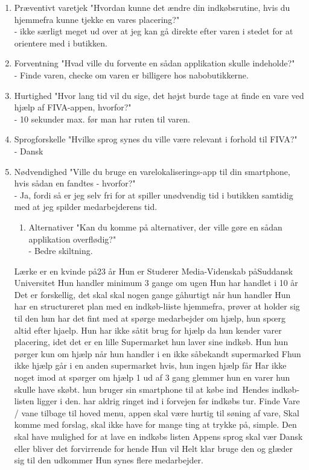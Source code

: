\begin{enumerate}
\begin{enumerate}
\begin{enumerate}
\item Præventivt varetjek "Hvordan kunne det ændre din indkøbsrutine, hvis du hjemmefra kunne tjekke en vares placering?"\\
  - ikke særligt meget ud over at jeg kan gå direkte efter varen i stedet for at orientere med i butikken.
\item Forventning "Hvad ville du forvente en sådan applikation skulle indeholde?"\\
  - Finde varen, checke om varen er billigere hos nabobutikkerne. 
\item Hurtighed	"Hvor lang tid vil du sige, det højst burde tage at finde en vare ved hjælp af FIVA-appen, hvorfor?"\\
  - 10 sekunder max. før man har ruten til varen.
\item Sprogforskelle "Hvilke sprog synes du ville være relevant i forhold til FIVA?"\\
  - Dansk
\item Nødvendighed "Ville du bruge en varelokaliserings-app til din smartphone, hvis sådan en fandtes - hvorfor?"\\
  - Ja, fordi så er jeg selv fri for at spiller unødvendig tid i butikken samtidig med at jeg spilder medarbejderens tid.
\begin{enumerate}
\item Alternativer "Kan du komme på alternativer, der ville gøre en sådan applikation overflødig?"\\
  - Bedre skiltning.
\end{enumerate}

L\ae rke er en kvinde p\aa  23 \aa r 
Hun er Studerer Media-Videnskab p\aa  Suddansk Universitet
Hun handler minimum 3 gange om ugen 
Hun har handlet i 10 \aa r
Det er forskellig, det skal skal nogen gange g\aa hurtigt n\aa r hun handler
Hun har en structureret plan med en indk\o b-liiste hjemmefra, pr\o ver at holder sig til den 
hun har det fint med at sp\o rge medarbejder om hj\ae lp, hun sp\oe rg altid efter hjaelp. 
Hun har ikke s\aa tit brug for hj\ae lp da hun kender varer placering, idet det er en lille Supermarket hun laver sine indk\o b.
Hun hun p\o rger kun om hj\ae lp n\aa r hun handler i en ikke s\aa  bekandt supermarked
F\aar hun ikke hj\ae lp g\aa r i en anden supermarket hvis, hun ingen hj\ae lp f\aa r
Har ikke noget imod at sp\o rger om hj\ae lp
1 ud af 3 gang glemmer hun en varer hun skulle have sk\o bt.
hun bruger sin smartphone til at k\o be ind\ Hendes indk\o b-listen ligger i den. 
har aldrig ringet ind i forvejen f\o r indk\o bs tur.
Finde Vare / vane tilbage til hoved menu, appen skal v\ae re hurtig til s\o ning af vare, Skal komme med forslag, skal ikke have for mange
ting at trykke p\aa, simple. Den skal have mulighed for at lave en indk\o bs listen
Appens sprog skal v\ae r Dansk eller bliver det forvirrende for hende
Hun vil Helt klar bruge den og gl\ae der sig til den udkommer
Hun synes flere medarbejder.


\end{enumerate}
\end{enumerate}
\end{enumerate}
